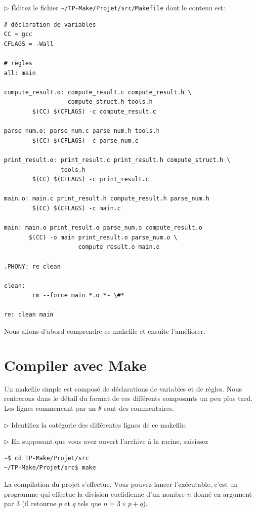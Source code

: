 \documentclass[11pt,a4paper]{article}
\newcommand{\must}{\noindent $\triangleright$ \xspace}
\begin{document}
\must Éditez le fichier {\small \verb!~/TP-Make/Projet/src/Makefile!}
dont le contenu est:
{\small
\begin{verbatim}
# déclaration de variables
CC = gcc
CFLAGS = -Wall

# règles
all: main

compute_result.o: compute_result.c compute_result.h \
                  compute_struct.h tools.h
        $(CC) $(CFLAGS) -c compute_result.c

parse_num.o: parse_num.c parse_num.h tools.h
        $(CC) $(CFLAGS) -c parse_num.c

print_result.o: print_result.c print_result.h compute_struct.h \
                tools.h
        $(CC) $(CFLAGS) -c print_result.c

main.o: main.c print_result.h compute_result.h parse_num.h
        $(CC) $(CFLAGS) -c main.c

main: main.o print_result.o parse_num.o compute_result.o
       $(CC) -o main print_result.o parse_num.o \
                     compute_result.o main.o

.PHONY: re clean

clean:
        rm --force main *.o *~ \#*

re: clean main
\end{verbatim}
}

\noindent Nous allons d'abord comprendre ce makefile et ensuite
l'améliorer.

\section{Compiler avec \textsf{Make}}

Un makefile simple est composé de déclarations de variables
et de règles. Nous rentrerons dans le détail du format de ces
différents composants un peu plus tard. Les lignes commencant par un
\verb!#! sont des commentaires.

\medskip

\must Identifiez la catégorie des différentes lignes de ce
makefile.

\must En supposant que vous avez ouvert l'archive à la racine, saisissez
{\small
\begin{verbatim}
~$ cd TP-Make/Projet/src
~/TP-Make/Projet/src$ make
\end{verbatim}
}

\noindent La compilation du projet s'effectue. Vous pouvez lancer
l'exécutable, c'est un programme qui effectue la division euclidienne
d'un nombre $n$ donné en argument par 3 (il retourne $p$ et $q$ tels
que $n = 3 \times p + q$).
\end{document}
